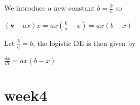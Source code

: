 \documentclass{article}
\begin{document}
\begin{enumerate}
        We introduce a new constant $b = \frac{k}{a}$ so
          \begin{center}
            $(k-ax)x = ax (\frac{k}{a}-x) = ax(b-x)$
          \end{center}

        Let $\frac{b}{a} = b$, the logistic DE is then given by

          \begin{center}
            $\frac{dx}{dt} = ax(b-x)$
          \end{center}
      \end{enumerate}

  \section{week4}
\end{document}
